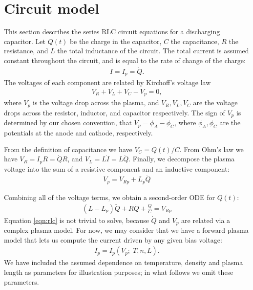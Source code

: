 \documentclass{article}
\begin{document}
\section{Circuit model}

This section describes the series RLC circuit equations for a discharging capacitor.
Let $Q(t)$ be the charge in the capacitor, $C$ the capacitance, $R$ the resistance,
and $L$ the total inductance of the circuit.
The total current is assumed constant throughout the circuit, and is equal to the rate of change of the charge:
\begin{align*}
    I = I_p = \dot{Q}.
\end{align*}
The voltages of each component are related by Kirchoff's voltage law
\begin{align}
V_R + V_L + V_C - V_p = 0,
\end{align}
where $V_p$ is the voltage drop across the plasma, and $V_R, V_L, V_C$ are the voltage drops across the resistor, inductor, and capacitor respectively.
The sign of $V_p$ is determined by our chosen convention, that $V_p = \phi_A - \phi_C$, where $\phi_A, \phi_C$ are the potentials at the
anode and cathode, respectively.

From the definition of capacitance we have $V_C = Q(t)/C$. From Ohm's law we have $V_R = I_p R = \dot{Q} R$, 
and $V_L = L \dot{I} = L \ddot{Q}$.
Finally, we decompose the plasma voltage into the sum of a resistive component and an inductive component:
\begin{align*}
    V_p = V_{Rp} + L_p \ddot{Q} 
\end{align*}

Combining all of the voltage terms, we obtain a second-order ODE for $Q(t)$:
\begin{align}
    \label{eqn:rlc}
    (L - L_p) \ddot{Q} + R \dot{Q} + \frac{Q}{C} = V_{Rp}
\end{align}
Equation \eqref{eqn:rlc} is not trivial to solve, because $\dot{Q}$ and $V_p$ are related
via a complex plasma model.
For now, we may consider that we have a forward plasma model that lets us compute the 
current driven by any given bias voltage:
\begin{align*}
I_p = I_p(V_p; \; T, n, L).
\end{align*}
We have included the assumed dependence on temperature, density and plasma length as parameters
for illustration purposes; in what follows we omit these parameters.
\end{document}
